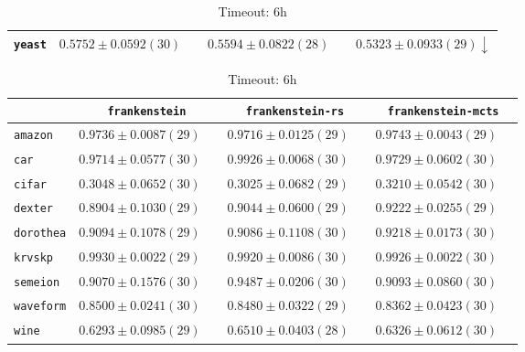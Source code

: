 \begin{table}[ht]
\begin{subtable}{\textwidth}
\begin{tabular}{l|ccc}
            \texttt{yeast} & $ 0.5752 \pm 0.0592 (30) \phantom{\downarrow}$ & $ 0.5594 \pm 0.0822 (28) \phantom{\downarrow}$ & $ 0.5323 \pm 0.0933 (29) \downarrow$\\
            \hline
        \end{tabular}
    \end{subtable}
    \par\bigskip
    \begin{subtable}{\textwidth}
        \centering
        \caption{Timeout: 6h}
        \begin{tabular}{l|ccc}
            & \texttt{frankenstein}  & \texttt{frankenstein-rs}  & \texttt{frankenstein-mcts} \\
            \hline
            \texttt{amazon} & $ 0.9736 \pm 0.0087 (29) \phantom{\downarrow}$ & $ 0.9716 \pm 0.0125 (29) \phantom{\downarrow}$ & $ 0.9743 \pm 0.0043 (29) \phantom{\downarrow}$\\
            \texttt{car} & $ 0.9714 \pm 0.0577 (30) \phantom{\downarrow}$ & $ 0.9926 \pm 0.0068 (30) \phantom{\downarrow}$ & $ 0.9729 \pm 0.0602 (30) \phantom{\downarrow}$\\
            \texttt{cifar} & $ 0.3048 \pm 0.0652 (30) \phantom{\downarrow}$ & $ 0.3025 \pm 0.0682 (29) \phantom{\downarrow}$ & $ 0.3210 \pm 0.0542 (30) \phantom{\downarrow}$\\
            \texttt{dexter} & $ 0.8904 \pm 0.1030 (29) \phantom{\downarrow}$ & $ 0.9044 \pm 0.0600 (29) \phantom{\downarrow}$ & $ 0.9222 \pm 0.0255 (29) \phantom{\downarrow}$\\
            \texttt{dorothea} & $ 0.9094 \pm 0.1078 (29) \phantom{\downarrow}$ & $ 0.9086 \pm 0.1108 (30) \phantom{\downarrow}$ & $ 0.9218 \pm 0.0173 (30) \phantom{\downarrow}$\\
            \texttt{krvskp} & $ 0.9930 \pm 0.0022 (29) \phantom{\downarrow}$ & $ 0.9920 \pm 0.0086 (30) \phantom{\downarrow}$ & $ 0.9926 \pm 0.0022 (30) \phantom{\downarrow}$\\
            \texttt{semeion} & $ 0.9070 \pm 0.1576 (30) \phantom{\downarrow}$ & $ 0.9487 \pm 0.0206 (30) \phantom{\downarrow}$ & $ 0.9093 \pm 0.0860 (30) \phantom{\downarrow}$\\
            \texttt{waveform} & $ 0.8500 \pm 0.0241 (30) \phantom{\downarrow}$ & $ 0.8480 \pm 0.0322 (29) \phantom{\downarrow}$ & $ 0.8362 \pm 0.0423 (30) \phantom{\downarrow}$\\
            \texttt{wine} & $ 0.6293 \pm 0.0985 (29) \phantom{\downarrow}$ & $ 0.6510 \pm 0.0403 (28) \phantom{\downarrow}$ & $ 0.6326 \pm 0.0612 (30) \phantom{\downarrow}$\\

\end{tabular}
\end{subtable}
\end{table}
